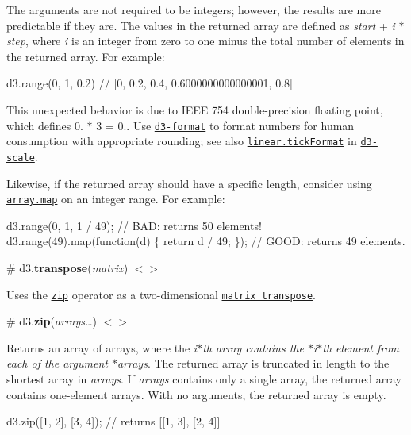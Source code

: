 The arguments are not required to be integers; however, the results are more predictable if they are. The values in the returned array are defined as {\itshape start} + {\itshape i} $\ast$ {\itshape step}, where {\itshape i} is an integer from zero to one minus the total number of elements in the returned array. For example\+:


\begin{DoxyCode}
d3.range(0, 1, 0.2) // [0, 0.2, 0.4, 0.6000000000000001, 0.8]
\end{DoxyCode}


This unexpected behavior is due to I\+E\+EE 754 double-\/precision floating point, which defines 0. $\ast$ 3 = 0.. Use \href{https://github.com/d3/d3-format}{\tt d3-\/format} to format numbers for human consumption with appropriate rounding; see also \href{https://github.com/d3/d3-scale/blob/master/README.md#linear_tickFormat}{\tt linear.\+tick\+Format} in \href{https://github.com/d3/d3-scale}{\tt d3-\/scale}.

Likewise, if the returned array should have a specific length, consider using \href{https://developer.mozilla.org/en-US/docs/Web/JavaScript/Reference/Global_Objects/Array/map}{\tt array.\+map} on an integer range. For example\+:


\begin{DoxyCode}
d3.range(0, 1, 1 / 49); // BAD: returns 50 elements!
d3.range(49).map(function(d) \{ return d / 49; \}); // GOOD: returns 49 elements.
\end{DoxyCode}


\label{_transpose}%
\# d3.{\bfseries transpose}({\itshape matrix}) \href{https://github.com/d3/d3-array/blob/master/src/transpose.js}{\tt $<$$>$}

Uses the \href{#zip}{\tt zip} operator as a two-\/dimensional \href{http://en.wikipedia.org/wiki/Transpose}{\tt matrix transpose}.

\label{_zip}%
\# d3.{\bfseries zip}({\itshape arrays…}) \href{https://github.com/d3/d3-array/blob/master/src/zip.js}{\tt $<$$>$}

Returns an array of arrays, where the {\itshape i$\ast$th array contains the $\ast$i$\ast$th element from each of the argument $\ast$arrays}. The returned array is truncated in length to the shortest array in {\itshape arrays}. If {\itshape arrays} contains only a single array, the returned array contains one-\/element arrays. With no arguments, the returned array is empty.


\begin{DoxyCode}
d3.zip([1, 2], [3, 4]); // returns [[1, 3], [2, 4]]
\end{DoxyCode}


